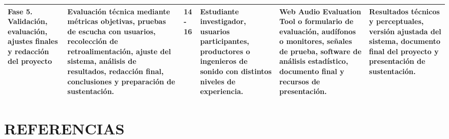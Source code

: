\documentclass[12pt]{article}
\begin{document}
\begin{longtable}{|p{2.2cm}|p{3.5cm}|p{1.0cm}|p{1.8cm}|p{2.8cm}|p{2.8cm}|}
\hline
Fase 5. Validación, evaluación, ajustes finales y redacción del proyecto & Evaluación técnica mediante métricas objetivas, pruebas de escucha con usuarios, recolección de retroalimentación, ajuste del sistema, análisis de resultados, redacción final, conclusiones y preparación de sustentación. & 14 - 16 & Estudiante investigador, usuarios participantes, productores o ingenieros de sonido con distintos niveles de experiencia. & Web Audio Evaluation Tool o formulario de evaluación, audífonos o monitores, señales de prueba, software de análisis estadístico, documento final y recursos de presentación. & Resultados técnicos y perceptuales, versión ajustada del sistema, documento final del proyecto y presentación de sustentación. \\
\hline
\end{longtable}


\clearpage
{}
{}
\section*{REFERENCIAS}
\end{document}
